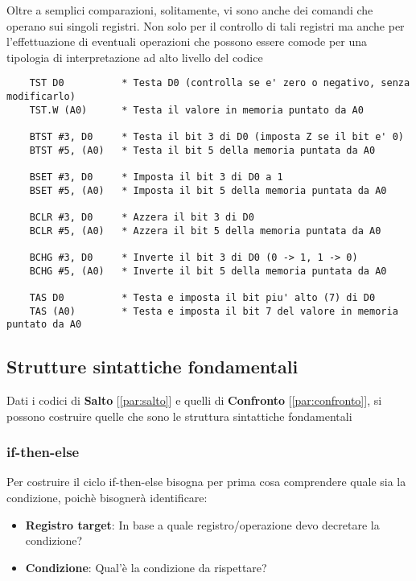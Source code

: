 Oltre a semplici comparazioni, solitamente, vi sono anche dei comandi che operano sui singoli registri. Non solo per il controllo di tali registri ma anche per l'effettuazione di eventuali operazioni che possono essere comode per una tipologia di interpretazione ad alto livello del codice
\begin{lstlisting}
    TST D0          * Testa D0 (controlla se e' zero o negativo, senza modificarlo)  
    TST.W (A0)      * Testa il valore in memoria puntato da A0  

    BTST #3, D0     * Testa il bit 3 di D0 (imposta Z se il bit e' 0)  
    BTST #5, (A0)   * Testa il bit 5 della memoria puntata da A0  

    BSET #3, D0     * Imposta il bit 3 di D0 a 1  
    BSET #5, (A0)   * Imposta il bit 5 della memoria puntata da A0  

    BCLR #3, D0     * Azzera il bit 3 di D0  
    BCLR #5, (A0)   * Azzera il bit 5 della memoria puntata da A0  

    BCHG #3, D0     * Inverte il bit 3 di D0 (0 -> 1, 1 -> 0)  
    BCHG #5, (A0)   * Inverte il bit 5 della memoria puntata da A0  

    TAS D0          * Testa e imposta il bit piu' alto (7) di D0  
    TAS (A0)        * Testa e imposta il bit 7 del valore in memoria puntato da A0  
\end{lstlisting}

\subsection{Strutture sintattiche fondamentali}
Dati i codici di \textbf{Salto} [\ref{par:salto}] e quelli di \textbf{Confronto} [\ref{par:confronto}], si possono costruire quelle che sono le struttura sintattiche fondamentali

\subsubsection{if-then-else}
Per costruire il ciclo if-then-else bisogna per prima cosa comprendere quale sia la condizione, poichè bisognerà identificare:
\begin{itemize}
    \item \textbf{Registro target}: In base a quale registro/operazione devo decretare la condizione?
    \item \textbf{Condizione}: Qual'è la condizione da rispettare?
\end{itemize}

